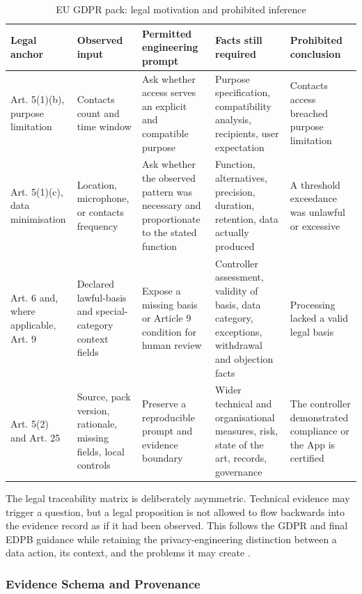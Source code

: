 \begin{table}[H]
\centering
\caption{EU GDPR pack: legal motivation and prohibited inference}
\label{tab:legal-traceability}
\scriptsize
\begin{tabular}{>{\raggedright\arraybackslash}p{}>{\raggedright\arraybackslash}p{}>{\raggedright\arraybackslash}p{}>{\raggedright\arraybackslash}p{}>{\raggedright\arraybackslash}p{}}
\toprule
Legal anchor & Observed input & Permitted engineering prompt & Facts still required & Prohibited conclusion \\
\midrule
Art. 5(1)(b), purpose limitation & Contacts count and time window & Ask whether access serves an explicit and compatible purpose & Purpose specification, compatibility analysis, recipients, user expectation & Contacts access breached purpose limitation \\
Art. 5(1)(c), data minimisation & Location, microphone, or contacts frequency & Ask whether the observed pattern was necessary and proportionate to the stated function & Function, alternatives, precision, duration, retention, data actually produced & A threshold exceedance was unlawful or excessive \\
Art. 6 and, where applicable, Art. 9 & Declared lawful-basis and special-category context fields & Expose a missing basis or Article 9 condition for human review & Controller assessment, validity of basis, data category, exceptions, withdrawal and objection facts & Processing lacked a valid legal basis \\
Art. 5(2) and Art. 25 & Source, pack version, rationale, missing fields, local controls & Preserve a reproducible prompt and evidence boundary & Wider technical and organisational measures, risk, state of the art, records, governance & The controller demonstrated compliance or the App is certified \\
\bottomrule
\end{tabular}
\end{table}

The legal traceability matrix is deliberately asymmetric. Technical evidence may trigger a question, but a legal proposition is not allowed to flow backwards into the evidence record as if it had been observed. This follows the GDPR and final EDPB guidance while retaining the privacy-engineering distinction between a data action, its context, and the problems it may create \cite{eurlex2016,edpb2019,nist8062}.

\subsubsection{Evidence Schema and Provenance}

